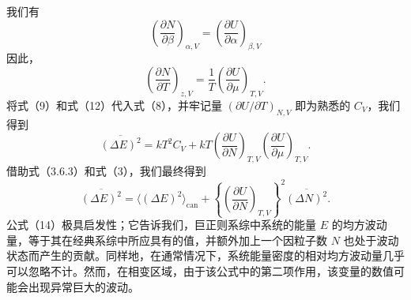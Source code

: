 我们有
\begin{equation}\tag{4.5.11}\label{eq:4.5.11}
\left( \frac { \partial N } { \partial \beta } \right) _ { \alpha , V } = \left( \frac { \partial U } { \partial \alpha } \right) _ { \beta , V }
\end{equation}
因此，
\begin{equation}\tag{4.5.12}\label{eq:4.5.12}
\left( \frac { \partial N } { \partial T } \right) _ { z , V } = \frac { 1 } { T } \left( \frac { \partial U } { \partial \mu } \right) _ { T , V } .
\end{equation}
将式（9）和式（12）代入式（8），并牢记量 \((\partial U/\partial T)_{N,V}\) 即为熟悉的 \(C_V\)，我们得到
\begin{equation}\tag{4.5.13}\label{eq:4.5.13}
\overline { { ( \Delta E ) ^{2} } } = k T ^{2} C _ { V } + k T \left( \frac { \partial U } { \partial N } \right) _ { T , V } \left( \frac { \partial U } { \partial \mu } \right) _ { T , V } .
\end{equation}
借助式（3.6.3）和式（3），我们最终得到
\begin{equation}\tag{4.5.14}\label{eq:4.5.14}
\overline { { ( \Delta E ) ^{2} } } = \langle ( \Delta E ) ^{2} \rangle _ { \mathrm { c a n } } + \left\{ \left( \frac { \partial U } { \partial N } \right) _ { T , V } \right\} ^{2} \overline { { ( \Delta N ) ^{2} } } .
\end{equation}
公式（14）极具启发性；它告诉我们，巨正则系综中系统的能量 \(E\) 的均方波动量，等于其在经典系综中所应具有的值，并额外加上一个因粒子数 \(N\) 也处于波动状态而产生的贡献。同样地，在通常情况下，系统能量密度的相对均方波动量几乎可以忽略不计。然而，在相变区域，由于该公式中的第二项作用，该变量的数值可能会出现异常巨大的波动。
